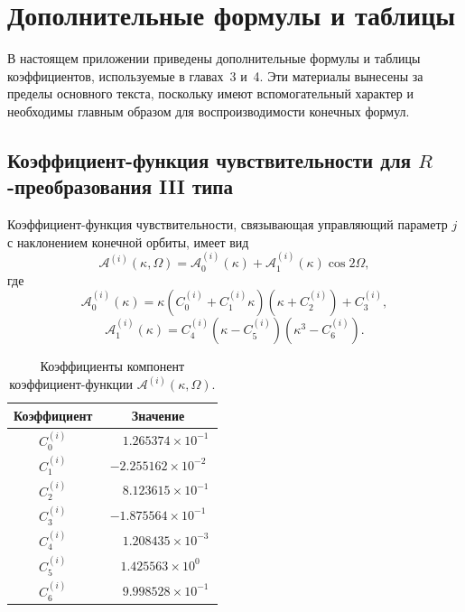 \chapter{Дополнительные формулы и таблицы}
\label{app:additional_formulas}
В настоящем приложении приведены дополнительные формулы и таблицы коэффициентов, используемые в главах~3 и~4. Эти материалы вынесены за пределы основного текста, поскольку имеют вспомогательный характер и необходимы главным образом для воспроизводимости конечных формул.

\section*{Коэффициент-функция чувствительности для \(R\)-преобразования III типа}

Коэффициент-функция чувствительности, связывающая управляющий параметр \(j\) с наклонением конечной орбиты, имеет вид
\begin{equation}
	\mathcal A^{(i)}(\kappa,\Omega)
	=
	\mathcal A_0^{(i)}(\kappa)+\mathcal A_1^{(i)}(\kappa)\cos 2\Omega,
	\label{eq:appendixC_Ai}
\end{equation}
где
\begin{equation}
	\mathcal A_0^{(i)}(\kappa)
	=
	\kappa
	\left(C_0^{(i)}+C_1^{(i)}\kappa\right)
	\left(\kappa+C_2^{(i)}\right)
	+C_3^{(i)},
	\label{eq:appendixC_Ai_0}
\end{equation}
\begin{equation}
	\mathcal A_1^{(i)}(\kappa)
	=
	C_4^{(i)}
	\left(\kappa-C_5^{(i)}\right)
	\left(\kappa^3-C_6^{(i)}\right).
	\label{eq:appendixC_Ai_1}
\end{equation}

\begin{table}[htbp]
	\centering
	\caption{Коэффициенты компонент коэффициент-функции \(\mathcal A^{(i)}(\kappa,\Omega)\).}
	\label{tab:appendixC_RiOmega}
	\begin{tabular}{|c|c|}
		\hline
		Коэффициент & Значение \\
		\hline
		\(C_0^{(i)}\) & \(\phantom{-}1.265374\times10^{-1}\) \\
		\(C_1^{(i)}\) & \(-2.255162\times10^{-2}\) \\
		\(C_2^{(i)}\) & \(\phantom{-}8.123615\times10^{-1}\) \\
		\(C_3^{(i)}\) & \(-1.875564\times10^{-1}\) \\
		\(C_4^{(i)}\) & \(\phantom{-}1.208435\times10^{-3}\) \\
		\(C_5^{(i)}\) & \(\phantom{-}1.425563\times10^{0\phantom{-}}\) \\
		\(C_6^{(i)}\) & \(\phantom{-}9.998528\times10^{-1}\) \\
		\hline
	\end{tabular}
\end{table}

